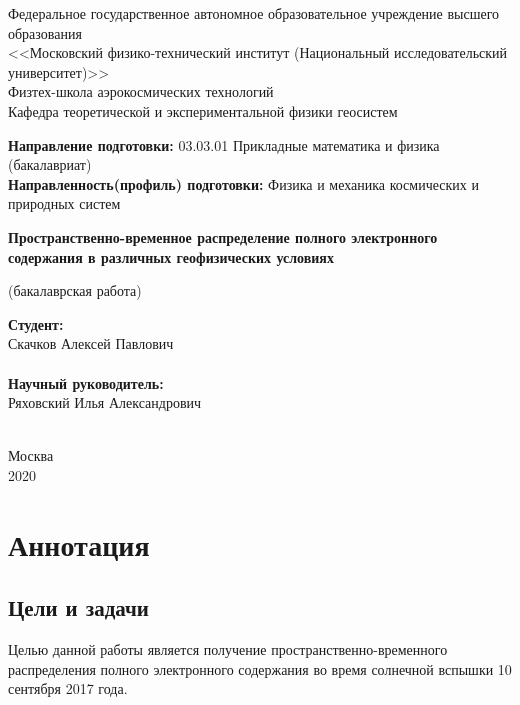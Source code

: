 \documentclass[14pt]{article}
\begin{document}
\begin{center}
\small
Федеральное государственное автономное образовательное учреждение высшего образования\\
<<Московский физико-технический институт (Национальный исследовательский университет)>> \\
Физтех-школа аэрокосмических технологий\\
Кафедра теоретической и экспериментальной физики геосистем
\end{center}

\begin{flushleft}
\small
\textbf{Направление подготовки:} 03.03.01 Прикладные математика и физика (бакалавриат)\\
\textbf{Направленность(профиль) подготовки:} Физика и механика космических и природных систем\\
\end{flushleft}

\begin{center}
\LARGE
\textbf{Пространственно-временное распределение полного электронного содержания в различных геофизических условиях}

\small(бакалаврская работа)
\end{center}


\begin{flushright}

\noindent
\textbf{Студент:} \\
Скачков Алексей Павлович\\
\underline{\hspace{3cm}}\\
\textbf{Научный руководитель:}\\
Ряховский Илья Александрович\\
\underline{\hspace{3cm}}\\

\end{flushright}

\begin{center}
\small
Москва\\
2020
\end{center}


\newpage
\section*{Аннотация}
\subsection*{Цели и задачи}
Целью данной работы является получение пространственно-временного распределения полного электронного содержания во время солнечной вспышки 10 сентября 2017 года.\\
\end{document}
